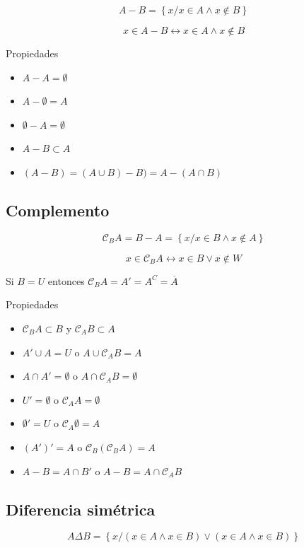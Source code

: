 \documentclass[
  16pt,
]{krantz}
\providecommand{\tightlist}{%
  \setlength{\itemsep}{0pt}\setlength{\parskip}{0pt}}
\theoremstyle{definition}
\theoremstyle{definition}
\theoremstyle{definition}
\theoremstyle{definition}
\theoremstyle{remark}
\begin{document}
\[
A- B=\left\{x/x\in A\wedge x\notin B\right\}
\]

\[
x\in A- B\leftrightarrow x\in A\wedge x\notin B
\]

Propiedades

\begin{itemize}
\tightlist
\item
  \(A- A=\emptyset\)
\item
  \(A- \emptyset=A\)
\item
  \(\emptyset-A=\emptyset\)
\item
  \(A- B\subset A\)
\item
  \((A-B)=(A\cup B)-B)=A-(A\cap B)\)
\end{itemize}

\hypertarget{complemento}{%
\subsection{Complemento}\label{complemento}}

\[
\mathcal{C}_BA=B-A=\left\{x/x\in B\wedge x\notin A\right\}
\]

\[
x\in \mathcal{C}_BA\leftrightarrow x\in B\vee x\notin W
\]

Si \(B=U\) entonces \(\mathcal{C}_BA=A'=A^C=\overline{A}\)

Propiedades

\begin{itemize}
\tightlist
\item
  \(\mathcal{C}_BA\subset B\) y \(\mathcal{C}_AB\subset A\)
\item
  \(A'\cup A=U\) o \(A\cup \mathcal{C}_AB=A\)
\item
  \(A\cap A'=\emptyset\) o \(A\cap \mathcal{C}_AB=\emptyset\)
\item
  \(U'=\emptyset\) o \(\mathcal{C}_AA=\emptyset\)
\item
  \(\emptyset'=U\) o \(\mathcal{C}_A\emptyset=A\)
\item
  \((A')'=A\) o \(\mathcal{C}_B(\mathcal{C}_BA)=A\)
\item
  \(A-B=A\cap B'\) o \(A-B=A\cap \mathcal{C}_AB\)
\end{itemize}

\hypertarget{diferencia-simuxe9trica}{%
\subsection{Diferencia simétrica}\label{diferencia-simuxe9trica}}

\[
A\Delta B=\left\{x/(x\in A\wedge x\in B)\vee (x\in A\wedge x\in B)\right\}
\]
\end{document}
